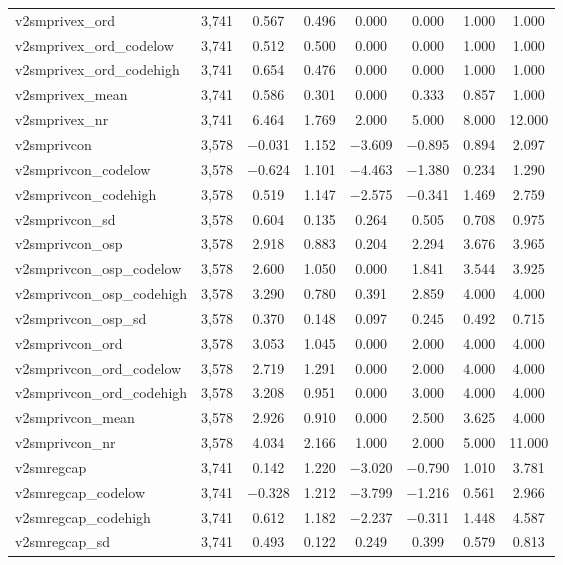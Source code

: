 \begin{table}[!htbp]
\begin{tabular}{@{\extracolsep{5pt}}lccccccc}
v2smprivex\_ord & 3,741 & 0.567 & 0.496 & 0.000 & 0.000 & 1.000 & 1.000 \\ 
v2smprivex\_ord\_codelow & 3,741 & 0.512 & 0.500 & 0.000 & 0.000 & 1.000 & 1.000 \\ 
v2smprivex\_ord\_codehigh & 3,741 & 0.654 & 0.476 & 0.000 & 0.000 & 1.000 & 1.000 \\ 
v2smprivex\_mean & 3,741 & 0.586 & 0.301 & 0.000 & 0.333 & 0.857 & 1.000 \\ 
v2smprivex\_nr & 3,741 & 6.464 & 1.769 & 2.000 & 5.000 & 8.000 & 12.000 \\ 
v2smprivcon & 3,578 & $-$0.031 & 1.152 & $-$3.609 & $-$0.895 & 0.894 & 2.097 \\ 
v2smprivcon\_codelow & 3,578 & $-$0.624 & 1.101 & $-$4.463 & $-$1.380 & 0.234 & 1.290 \\ 
v2smprivcon\_codehigh & 3,578 & 0.519 & 1.147 & $-$2.575 & $-$0.341 & 1.469 & 2.759 \\ 
v2smprivcon\_sd & 3,578 & 0.604 & 0.135 & 0.264 & 0.505 & 0.708 & 0.975 \\ 
v2smprivcon\_osp & 3,578 & 2.918 & 0.883 & 0.204 & 2.294 & 3.676 & 3.965 \\ 
v2smprivcon\_osp\_codelow & 3,578 & 2.600 & 1.050 & 0.000 & 1.841 & 3.544 & 3.925 \\ 
v2smprivcon\_osp\_codehigh & 3,578 & 3.290 & 0.780 & 0.391 & 2.859 & 4.000 & 4.000 \\ 
v2smprivcon\_osp\_sd & 3,578 & 0.370 & 0.148 & 0.097 & 0.245 & 0.492 & 0.715 \\ 
v2smprivcon\_ord & 3,578 & 3.053 & 1.045 & 0.000 & 2.000 & 4.000 & 4.000 \\ 
v2smprivcon\_ord\_codelow & 3,578 & 2.719 & 1.291 & 0.000 & 2.000 & 4.000 & 4.000 \\ 
v2smprivcon\_ord\_codehigh & 3,578 & 3.208 & 0.951 & 0.000 & 3.000 & 4.000 & 4.000 \\ 
v2smprivcon\_mean & 3,578 & 2.926 & 0.910 & 0.000 & 2.500 & 3.625 & 4.000 \\ 
v2smprivcon\_nr & 3,578 & 4.034 & 2.166 & 1.000 & 2.000 & 5.000 & 11.000 \\ 
v2smregcap & 3,741 & 0.142 & 1.220 & $-$3.020 & $-$0.790 & 1.010 & 3.781 \\ 
v2smregcap\_codelow & 3,741 & $-$0.328 & 1.212 & $-$3.799 & $-$1.216 & 0.561 & 2.966 \\ 
v2smregcap\_codehigh & 3,741 & 0.612 & 1.182 & $-$2.237 & $-$0.311 & 1.448 & 4.587 \\ 
v2smregcap\_sd & 3,741 & 0.493 & 0.122 & 0.249 & 0.399 & 0.579 & 0.813 \\ 

\end{tabular}
\end{table}
